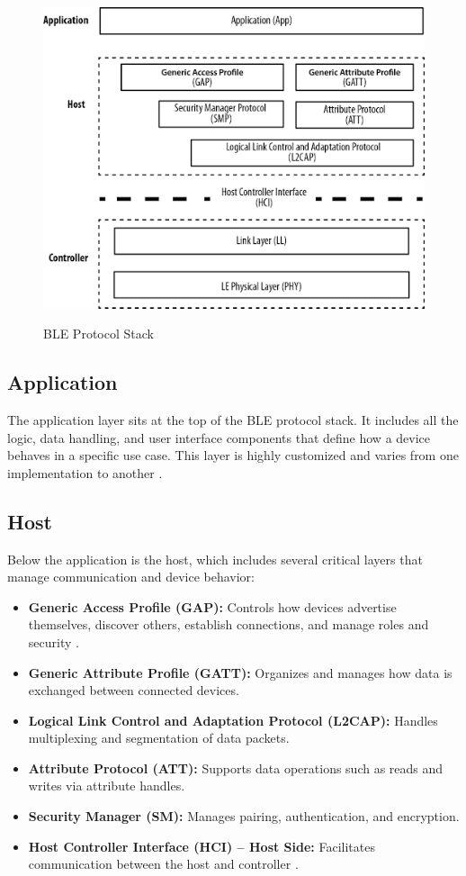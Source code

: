 \begin{figure}[h]
    \caption{BLE Protocol Stack}
    \includegraphics[scale=.7]{bleprotocolstack.png}
    \label{fig:bleprotocolstack}
    \end{figure}

\subsection{Application}

The application layer sits at the top of the BLE protocol stack. It includes all the logic, data handling, and user interface components that define how a device behaves in a specific use case. This layer is highly customized and varies from one implementation to another \cite{nextgenBLE}.

\subsection{Host}

Below the application is the host, which includes several critical layers that manage communication and device behavior:

\begin{itemize}
    \item \textbf{Generic Access Profile (GAP):} Controls how devices advertise themselves, discover others, establish connections, and manage roles and security \cite{nextgenBLE}.
    \item \textbf{Generic Attribute Profile (GATT):} Organizes and manages how data is exchanged between connected devices.
    \item \textbf{Logical Link Control and Adaptation Protocol (L2CAP):} Handles multiplexing and segmentation of data packets.
    \item \textbf{Attribute Protocol (ATT):} Supports data operations such as reads and writes via attribute handles.
    \item \textbf{Security Manager (SM):} Manages pairing, authentication, and encryption.
    \item \textbf{Host Controller Interface (HCI) – Host Side:} Facilitates communication between the host and controller \cite{nextgenBLE}.
\end{itemize}

